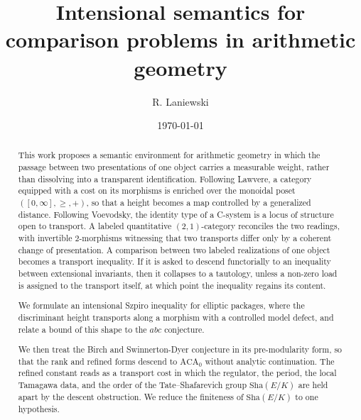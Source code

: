 \documentclass[10pt, reqno]{amsart}
\theoremstyle{plain}
\theoremstyle{definition}
\theoremstyle{plain}
\begin{document}
\title[Intensional semantics for comparison problems]{Intensional semantics for comparison problems in arithmetic geometry}
\date{\today}
\author{R. Laniewski}


\begin{abstract}
This work proposes a semantic environment for arithmetic geometry in which the passage between two presentations of one object carries a measurable weight, rather than dissolving into a transparent identification. Following Lawvere, a category equipped with a cost on its morphisms is enriched over the monoidal poset $([0,\infty],\ge,+)$, so that a height becomes a map controlled by a generalized distance. Following Voevodsky, the identity type of a C-system is a locus of structure open to transport. A labeled quantitative $(2,1)$-category reconciles the two readings, with invertible $2$-morphisms witnessing that two transports differ only by a coherent change of presentation. A comparison between two labeled realizations of one object becomes a transport inequality. If it is asked to descend functorially to an inequality between extensional invariants, then it collapses to a tautology, unless a non-zero load is assigned to the transport itself, at which point the inequality regains its content.

We formulate an intensional Szpiro inequality for elliptic packages, where the discriminant height transports along a morphism with a controlled model defect, and relate a bound of this shape to the $abc$ conjecture.

We then treat the Birch and Swinnerton-Dyer conjecture in its pre-modularity form, so that the rank and refined forms descend to $\mathrm{ACA}_{0}$ without analytic continuation. The refined constant reads as a transport cost in which the regulator, the period, the local Tamagawa data, and the order of the Tate--Shafarevich group $\mathrm{Sha}(E/K)$ are held apart by the descent obstruction. We reduce the finiteness of $\mathrm{Sha}(E/K)$ to one hypothesis.
\end{abstract}

\maketitle
\end{document}
